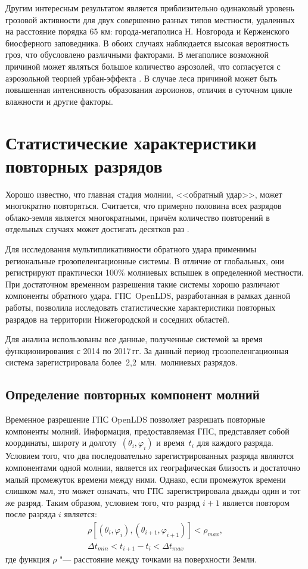 Другим интересным результатом является приблизительно одинаковый уровень грозовой активности для двух совершенно разных типов местности, удаленных на расстояние порядка 65 км: города-мегаполиса Н. Новгорода и Керженского биосферного заповедника. В обоих случаях наблюдается высокая вероятность гроз, что обусловлено различными факторами. В мегаполисе возможной причиной может являться большое количество аэрозолей, что согласуется с аэрозольной теорией урбан-эффекта \cite{Farias2009}. В случае леса причиной может быть повышенная интенсивность образования аэроионов, отличия в суточном цикле влажности и другие факторы.

\section{Статистические характеристики повторных разрядов}
\label{sec:lds-stat-rep}
Хорошо известно, что главная стадия молнии, <<обратный удар>>, может многократно повторяться. Считается, что примерно половина всех разрядов облако-земля является многократными, причём количество повторений в отдельных случаях может достигать десятков раз \cite{RakovUman2005}. 

Для исследования мультипликативности обратного удара применимы региональные грозопеленгационные системы. В отличие от глобальных, они регистрируют практически 100\% молниевых вспышек в определенной местности. При достаточном временном разрешения такие системы хорошо различают компоненты обратного удара. ГПС~OpenLDS, разработанная в рамках данной работы, позволила исследовать статистические характеристики повторных разрядов на территории Нижегородской и соседних областей.

Для анализа использованы все данные, полученные системой за время функционирования с 2014 по 2017\,гг. За данный период грозопеленгационная система зарегистрировала более~2,2~млн.~молниевых разрядов.

\subsection{Определение повторных компонент молний}
Временное разрешение ГПС OpenLDS позволяет разрешать повторные компоненты молний. Информация, предоставляемая ГПС, представляет собой координаты, широту и долготу~$(\theta_i, \varphi_i)$ и время~$t_i$ для каждого разряда. Условием того, что два последовательно зарегистрированных разряда являются компонентами одной молнии, является их географическая близость и достаточно малый промежуток времени между ними. Однако, если промежуток времени слишком мал, это может означать, что ГПС зарегистрировала дважды один и тот же разряд. Таким образом, условием того, что разряд $i+1$ является повтором после разряда $i$ является:
\begin{equation}
	\begin{gathered}
		\rho\left[(\theta_i, \varphi_i), (\theta_{i+1}, \varphi_{i+1})\right] < \rho_{max},\\ \Delta t_{min} < t_{i+1} - t_i < \Delta t_{max}
		\label{eq:criteria}
	\end{gathered}
\end{equation}
где функция $\rho$ "--- расстояние между точками на поверхности Земли.

